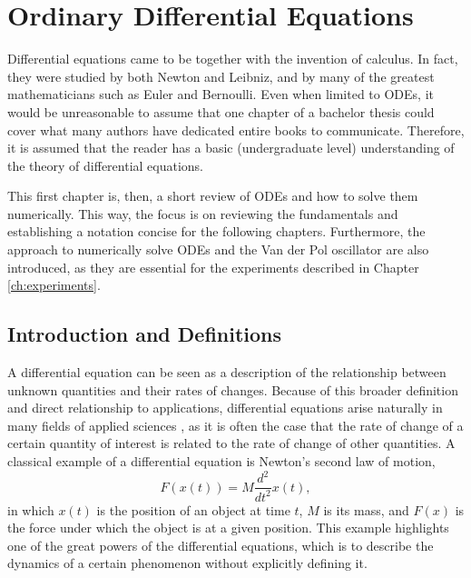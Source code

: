 \chapter{Ordinary Differential Equations}\label{ch:ode}

Differential equations came to be together with the invention of calculus.
In fact, they were studied by both Newton and Leibniz, and by many of the greatest mathematicians such as Euler and Bernoulli.
Even when limited to \gls{ODE}s, it would be unreasonable to assume that one chapter of a bachelor thesis could cover what many authors have dedicated entire books to communicate.
Therefore, it is assumed that the reader has a basic (undergraduate level) understanding of the theory of differential equations\footnotemark.

This first chapter is, then, a short review of \gls{ODE}s and how to solve them numerically.
This way, the focus is on reviewing the fundamentals and establishing a notation concise for the following chapters.
Furthermore, the approach to numerically solve \gls{ODE}s and the Van der Pol oscillator are also introduced, as they are essential for the experiments described in Chapter \ref{ch:experiments}.

\section{Introduction and Definitions}

A differential equation can be seen as a description of the relationship between unknown quantities and their rates of changes.
Because of this broader definition and direct relationship to applications, differential equations arise naturally in many fields of applied sciences \cite{hairer_solving_1993}, as it is often the case that the rate of change of a certain quantity of interest is related to the rate of change of other quantities.
A classical example of a differential equation is Newton's second law of motion, 
\[
   F\left( x\left( t \right) \right) = M \frac{d^2}{d t^2} x(t)
,\] 
in which $x\left( t \right) $ is the position of an object at time $t$, $M$ is its mass, and $F(x)$ is the force under which the object is at a given position.
This example highlights one of the great powers of the differential equations, which is to describe the dynamics of a certain phenomenon without explicitly defining it.


